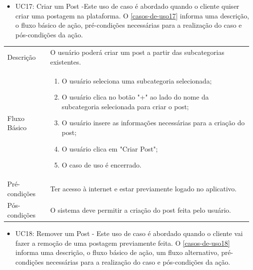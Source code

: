 
\begin{itemize}
	\item UC17: Criar um Post -Este uso de caso é abordado quando o cliente quiser criar uma postagem na plataforma. O 	\autoref{casos-de-uso17} informa uma descrição, o fluxo básico de ação, pré-condições necessárias para a realização do caso e pós-condições da ação.\\
\end{itemize}


\begin{quadro}[htb]
	\centering
	\ABNTEXfontereduzida
	\caption[Caso de Uso Criar um Post]{Caso de Uso Criar um Post}
	\label{casos-de-uso17}
\end{quadro}
\begin{longtable}{|p{3.3cm}|p{12.3cm}|}
	\hline
	\thead{} & \thead{Ator} \\
	\hline
	Descrição & O usuário poderá criar um post a partir das subcategorias existentes. \\
	\hline
	Fluxo Básico  & 
	\begin{enumerate}
		\item O usuário seleciona uma subcategoria selecionada;
		\item O usuário clica no botão "+" ao lado do nome da subcategoria selecionada para criar o post;
		\item O usuário insere as informações necessárias para a criação do post;
		\item O usuário clica em "Criar Post"; 
		\item O caso de uso é encerrado. 
	\end{enumerate}\\
	\hline
	Pré-condições & Ter acesso à internet e estar previamente logado no aplicativo.\\
	\hline
	Pós-condições & O sistema deve permitir a criação do post feita pelo usuário.\\
	\hline
\end{longtable}

\begin{itemize}
	\item UC18: Remover um Post - Este uso de caso é abordado quando o cliente vai fazer a remoção de uma postagem previamente feita. O \autoref{casos-de-uso18} informa uma descrição, o fluxo básico de ação, um fluxo alternativo, pré-condições necessárias para a realização do caso e pós-condições da ação.\\
\end{itemize}

